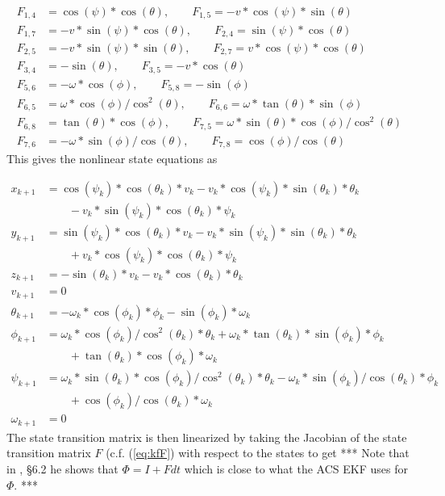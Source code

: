 \begin{align*}
F_{1,4} &= \cos(\psi)*\cos(\theta), \qquad F_{1,5} = -v*\cos(\psi)*\sin(\theta) \\
F_{1,7} &= -v*\sin(\psi)*\cos(\theta), \qquad F_{2,4} = \sin(\psi)*\cos(\theta) \\
F_{2,5} &= -v*\sin(\psi)*\sin(\theta), \qquad F_{2,7} = v*\cos(\psi)*\cos(\theta) \\
F_{3,4} &= -\sin(\theta), \qquad F_{3,5} = -v*\cos(\theta) \\
F_{5,6} &= -\omega *\cos(\phi), \qquad F_{5,8} = -\sin(\phi) \\
F_{6,5} &= \omega *\cos(\phi)/\cos^2(\theta), \qquad F_{6,6} = \omega *\tan(\theta)*\sin(\phi) \\
F_{6,8} &= \tan(\theta)*\cos(\phi), \qquad F_{7,5} = \omega *\sin(\theta)*\cos(\phi)/\cos^2(\theta) \\
F_{7,6} &= -\omega *\sin(\phi)/\cos(\theta), \qquad F_{7,8} = \cos(\phi)/\cos(\theta)
\end{align*}
This gives the nonlinear state equations as

\begin{align*}
x_{k+1} &= \cos(\psi_k)*\cos(\theta_k)*v_k - v_k*\cos(\psi_k)*\sin(\theta_k)*\theta_k \\
&\qquad- v_k*\sin(\psi_k)*\cos(\theta_k)*\psi_k \\
y_{k+1} &= \sin(\psi_k)*\cos(\theta_k)*v_k - v_k*\sin(\psi_k)*\sin(\theta_k)*\theta_k \\
&\qquad+ v_k*\cos(\psi_k)*\cos(\theta_k)*\psi_k \\
z_{k+1} &= -\sin(\theta_k)*v_k - v_k*\cos(\theta_k)*\theta_k \\
v_{k+1} &= 0 \\
\theta_{k+1} &= -\omega_k *\cos(\phi_k)*\phi_k - \sin(\phi_k)*\omega_k \\
\phi_{k+1} &= \omega_k *\cos(\phi_k)/\cos^2(\theta_k)*\theta_k + \omega_k *\tan(\theta_k)*\sin(\phi_k)*\phi_k \\
&\qquad+ \tan(\theta_k)*\cos(\phi_k)*\omega_k \\
\psi_{k+1} &= \omega_k *\sin(\theta_k)*\cos(\phi_k)/\cos^2(\theta_k)*\theta_k - \omega_k *\sin(\phi_k)/\cos(\theta_k)*\phi_k \\
&\qquad+ \cos(\phi_k)/\cos(\theta_k)*\omega_k \\
\omega_{k+1} &= 0
\end{align*}
The state transition matrix is then linearized by taking the Jacobian of the state transition matrix $F$ (c.f. (\ref{eq:kfF}) with respect to the states to get *** Note that in \cite{Kelly_1994_338}, \S6.2 he shows that $\Phi = I + Fdt$ which is close to what the ACS EKF uses for $\Phi$. ***

